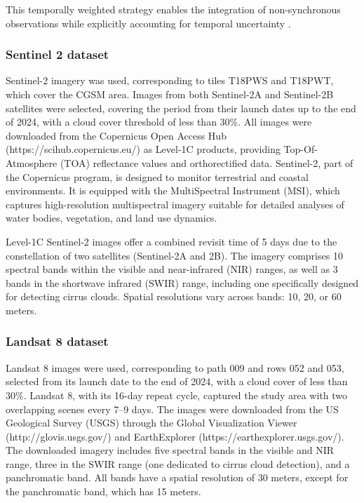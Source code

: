 \documentclass[remotesensing,article,submit,pdftex,moreauthors]{Definitions/mdpi}
\begin{document}
This temporally weighted strategy enables the integration of
non-synchronous observations while explicitly accounting for temporal
uncertainty \citep{Pahlevan2022, Espinoza2025}.


\subsubsection{Sentinel 2 dataset}

Sentinel-2 imagery was used, corresponding to tiles T18PWS and T18PWT, which cover the CGSM area. Images from both Sentinel-2A and Sentinel-2B satellites were selected, covering the period from their launch dates up to the end of 2024, with a cloud cover threshold of less than 30\%. All images were downloaded from the Copernicus Open Access Hub (https://scihub.copernicus.eu/) as Level-1C products, providing Top-Of-Atmosphere (TOA) reflectance values and orthorectified data. Sentinel-2, part of the Copernicus program, is designed to monitor terrestrial and coastal environments. It is equipped with the MultiSpectral Instrument (MSI), which captures high-resolution multispectral imagery suitable for detailed analyses of water bodies, vegetation, and land use dynamics.

Level-1C Sentinel-2 images offer a combined revisit time of 5 days due to the constellation of two satellites (Sentinel-2A and 2B). The imagery comprises 10 spectral bands within the visible and near-infrared (NIR) ranges, as well as 3 bands in the shortwave infrared (SWIR) range, including one specifically designed for detecting cirrus clouds. Spatial resolutions vary across bands: 10, 20, or 60 meters.

\subsubsection{Landsat 8 dataset}

Landsat 8 images were used, corresponding to path 009 and rows 052 and 053, selected from its launch date to the end of 2024, with a cloud cover of less than 30\%. Landsat 8, with its 16-day repeat cycle, captured the study area with two overlapping scenes every 7–9 days. The images were downloaded from the US Geological Survey (USGS) through the Global Visualization Viewer (http://glovis.usgs.gov/) and EarthExplorer (https://earthexplorer.usgs.gov/). The downloaded imagery includes five spectral bands in the visible and NIR range, three in the SWIR range (one dedicated to cirrus cloud detection), and a panchromatic band. All bands have a spatial resolution of 30 meters, except for the panchromatic band, which has 15 meters.
\end{document}
